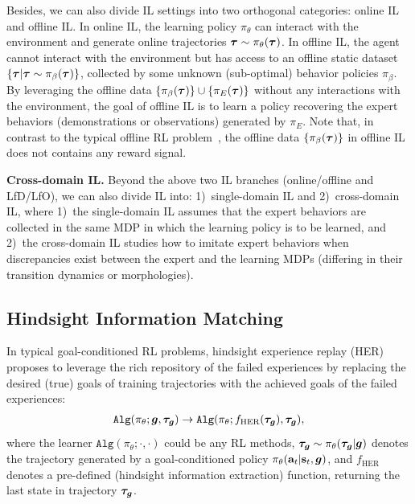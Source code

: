 Besides, we can also divide IL settings into two orthogonal categories: {{online IL}} and {{offline IL}}. 
In {{{online IL}}}, the learning policy $\pi_\theta$ can interact with the environment and generate online trajectories ${\bm{\tau}}\sim\pi_\theta({\bm{\tau}})$. %
In {{{offline IL}}}, the agent cannot interact with the environment but has access to an offline static dataset $\{{\bm{\tau}} |{\bm{\tau}} \sim \pi_\beta({\bm{\tau}})\}$, collected by some unknown (sub-optimal) behavior policies $\pi_\beta$. By leveraging the offline data $\{\pi_\beta({\bm{\tau}})\} \cup \{\pi_E({\bm{\tau}})\}$ without any interactions with the environment, the goal of offline IL is to learn a policy recovering the expert behaviors (demonstrations or observations) generated by $\pi_E$. Note that, in contrast to the typical offline RL problem~\citep{levine2020offline}, the offline data $\{\pi_\beta({\bm{\tau}})\}$ in offline IL does not {contains} any reward signal. 

\textbf{Cross-domain IL.} Beyond the above two IL branches (online/offline and LfD/LfO), we can also divide IL into: 1)~single-domain IL and 2)~cross-domain IL, where 1)~the single-domain IL assumes that the expert behaviors are collected in the same MDP in which the learning policy is to be learned, and 2)~the cross-domain IL studies how to imitate expert behaviors when
discrepancies exist between the expert and the learning MDPs (\eg differing in their transition dynamics or morphologies). 





\subsection{Hindsight Information Matching} 
\label{sec:hindsight-infomation-matching}

In typical goal-conditioned RL problems, hindsight experience replay (HER) proposes to leverage the rich repository of the failed experiences by replacing the desired (true) goals of training trajectories with the achieved goals of the failed experiences:  
\begin{align}
	\texttt{Alg} (\pi_\theta; {\bm{g}}, {\bm{\tau}}_{\bm{g}}) \to \texttt{Alg} (\pi_\theta; {f}_{\text{HER}}({\bm{\tau}}_{\bm{g}}), {\bm{\tau}}_{\bm{g}}), \nonumber
\end{align}
where the learner $\texttt{Alg}(\pi_\theta; \cdot, \cdot)$ could be any RL methods, ${\bm{\tau}}_{\bm{g}}\sim\pi_\theta({\bm{\tau}}_{\bm{g}}|{\bm{g}})$ denotes the trajectory generated by a goal-conditioned policy $\pi_\theta(\mathbf{a}_t|\mathbf{s}_t,{\bm{g}})$, and ${f}_{\text{HER}}$ denotes a pre-defined (hindsight information extraction) function, \eg returning the last state in trajectory ${\bm{\tau}}_{\bm{g}}$. 

